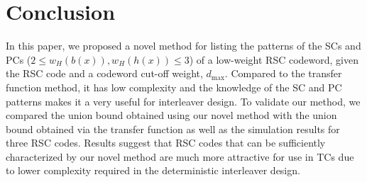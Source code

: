 \section{Conclusion}
\label{sec6}
In this paper, we proposed a novel method for  listing the patterns of the SCs and PCs ($2 \leq w_H(b(x)),w_H(h(x)) \leq 3$) of a low-weight RSC codeword, given the RSC code and a codeword cut-off weight, $d_{\text{max}}$.
Compared to the transfer function method, it has low complexity and the knowledge of the SC and PC patterns makes it a very useful for interleaver design. To validate our method, we compared the union bound obtained using our novel method with the union bound obtained via the transfer function as well as the simulation results for three RSC codes. Results suggest that RSC codes that can be sufficiently characterized by our novel method are much more attractive for use in TCs due to lower complexity required in the deterministic interleaver design.
